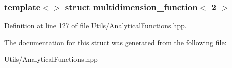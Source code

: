 \subsubsection*{template$<$$>$\newline
struct multidimension\+\_\+function$<$ 2 $>$}



Definition at line 127 of file Utils/\+Analytical\+Functions.\+hpp.



The documentation for this struct was generated from the following file\+:\begin{DoxyCompactItemize}
\item 
Utils/\+Analytical\+Functions.\+hpp\end{DoxyCompactItemize}

